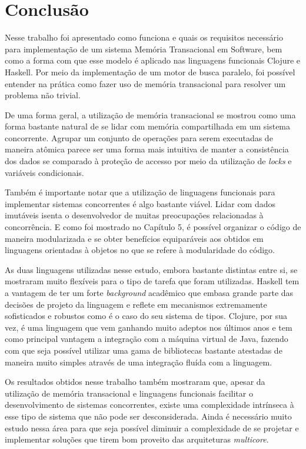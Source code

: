 \chapter{Conclusão}

Nesse trabalho foi apresentado como funciona e quais os requisitos necessário para implementação de um sistema Memória Transacional em Software, bem como a forma com que esse modelo é aplicado nas linguagens funcionais Clojure e Haskell. Por meio da implementação de um motor de busca paralelo, foi possível entender na prática como fazer uso de memória transacional para resolver um problema não trivial.

De uma forma geral, a utilização de memória transacional se mostrou como uma forma bastante natural de se lidar com memória compartilhada em um sistema concorrente. Agrupar um conjunto de operações para serem executadas de maneira atômica parece ser uma forma mais intuitiva de manter a consistência dos dados se comparado à proteção de accesso por meio da utilização de \emph{locks} e variáveis condicionais.

Também é importante notar que a utilização de linguagens funcionais para implementar sistemas concorrentes é algo bastante viável. Lidar com dados imutáveis isenta o desenvolvedor de muitas preocupações relacionadas à concorrência. E como foi mostrado no Capítulo 5, é possível organizar o código de maneira modularizada e se obter benefícios equiparáveis aos obtidos em linguagens orientadas à objetos no que se refere à modularidade do código.

As duas linguagens utilizadas nesse estudo, embora bastante distintas entre si, se mostraram muito flexíveis para o tipo de tarefa que foram utilizadas. Haskell tem a vantagem de ter um forte \emph{background} acadêmico que embasa grande parte das decisões de projeto da linguagem e reflete em mecanismos extremamente sofisticados e robustos como é o caso do seu sistema de tipos. Clojure, por sua vez, é uma linguagem que vem ganhando muito adeptos nos últimos anos e tem como principal vantagem a integração com a máquina virtual de Java, fazendo com que seja possível utilizar uma gama de bibliotecas bastante atestadas de maneira muito simples através de uma integração fluída com a linguagem.

Os resultados obtidos nesse trabalho também mostraram que, apesar da utilização de memória transacional e linguagens funcionais facilitar o desenvolvimento de sistemas concorrentes, existe uma complexidade intrínseca à esse tipo de sistema que não pode ser desconsiderada. Ainda é necessário muito estudo nessa área para que seja possível diminuir a complexidade de se projetar e implementar soluções que tirem bom proveito das arquiteturas \emph{multicore}.

